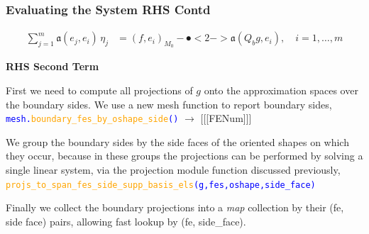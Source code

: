 \documentclass[compress]{beamer}
\begin{document}
\begin{frame}
  \frametitle{Evaluating the System RHS Contd}
  \vspace{-.29cm}
  \begin{align*}
    \sum_{j=1}^m{\mathfrak{a}(e_j, e_i) \,\eta_j} &= (f, e_i)_{M_0} - \spot<2->{\mathfrak{a}(Q_b g, e_i)}, \quad i=1,\dots,m
  \end{align*}
  
  \pause
  \uncover<+-> {
  \textbf{RHS Second Term}

  \vspace{.2cm}
  First we need to compute all projections of $g$ onto the approximation spaces over the boundary sides.
  We use a new mesh function to report boundary sides,
  {\small \texttt{\textcolor{blue}{mesh.\textcolor{orange}{boundary\_fes\_by\_oshape\_side}()}} $\rightarrow$ [[[FENum]]]}

  \uncover<+-> {
    We group the boundary sides by the side faces of the oriented shapes on which they occur, because in these groups the projections
    can be performed by solving a single linear system, via the projection module function discussed previously,\\
    {\small \texttt{\textcolor{blue}{\textcolor{orange}{projs\_to\_span\_fes\_side\_supp\_basis\_els}({\small{g,fes,oshape,side\_face}})}}}

  \uncover<+-> {
  \vspace{.1cm}
  Finally we collect the boundary projections into a \emph{map} collection by their (fe, side face) pairs, 
  allowing fast lookup by (fe, side\_face).
  }}}
\end{frame}
\end{document}
